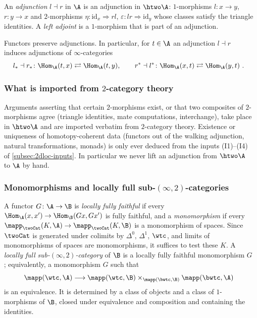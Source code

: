\begin{defi}
\label{def:adjunction}
An \emph{adjunction} $l \dashv r$ in $\A$ is an adjunction in $\htwo\A$: $1$-morphisms $l\colon x \to y$, $r\colon y \to x$ and $2$-morphisms $\eta\colon \mathrm{id}_{x} \Rightarrow rl$, $\varepsilon\colon lr \Rightarrow \mathrm{id}_{y}$ whose classes satisfy the triangle identities. A \emph{left adjoint} is a $1$-morphism that is part of an adjunction.
\end{defi}

Functors preserve adjunctions. In particular, for $t \in \A$ an adjunction $l \dashv r$ induces adjunctions of $\infty$-categories \cite{riehlverity2015twocategory}
\[
l_{*} \dashv r_{*}\colon \Hom_{\A}(t,x) \rightleftarrows \Hom_{\A}(t,y) , \qquad r^{*} \dashv l^{*}\colon \Hom_{\A}(x,t) \rightleftarrows \Hom_{\A}(y,t) \ .
\]

\subsubsection*{What is imported from $2$-category theory}
Arguments asserting that certain $2$-morphisms exist, or that two composites of $2$-morphisms agree (triangle identities, mate computations, interchange), take place in $\htwo\A$ and are imported verbatim from $2$-category theory.
Existence or uniqueness of homotopy-coherent data (functors out of the walking adjunction, natural transformations, monads) is only ever deduced from the inputs (I1)--(I4) of \cref{subsec:2dloc-inputs}. In particular we never lift an adjunction from $\htwo\A$ to $\A$ by hand.

\subsubsection*{Monomorphisms and locally full sub-$(\infty,2)$-categories}
A functor $G\colon \A \to \B$ is \emph{locally fully faithful} if every $\Hom_{\A}(x,x') \to \Hom_{\B}(Gx,Gx')$ is fully faithful, and a \emph{monomorphism} if every $\mapp_{\twoCat}(K,\A) \to \mapp_{\twoCat}(K,\B)$ is a monomorphism of spaces.
Since $\twoCat$ is generated under colimits by $\Delta^{0}$, $\Delta^{1}$, $\wtc$, and limits of monomorphisms of spaces are monomorphisms, it suffices to test these $K$.
A \emph{locally full sub-$(\infty,2)$-category} of $\B$ is a locally fully faithful monomorphism $G$; equivalently, a monomorphism $G$ such that
\[
\mapp(\wtc,\A) \longrightarrow \mapp(\wtc,\B) \times_{\mapp(\bwtc,\B)} \mapp(\bwtc,\A)
\]
is an equivalence. It is determined by a class of objects and a class of $1$-morphisms of $\B$, closed under equivalence and composition and containing the identities.
